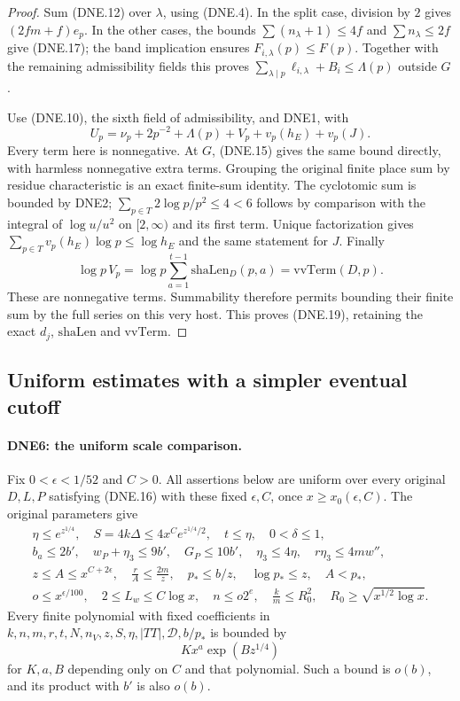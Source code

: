 \begin{proof}
Sum (DNE.12) over $\lambda$, using (DNE.4).
In the split case, division by $2$ gives $(2fm+f)e_p$.
In the other cases, the bounds $\sum(n_\lambda+1)\le4f$
and $\sum n_\lambda\le2f$ give (DNE.17); the band implication
ensures $F_{i,\lambda}(p)\le F(p)$.  Together with the remaining
admissibility fields this proves
$\sum_{\lambda\mid p}\ell_{i,\lambda}+B_i\le\Lambda(p)$
outside $G$.

Use (DNE.10), the sixth field of admissibility, and DNE1, with
\[
 U_p=\nu_p+2p^{-2}+\Lambda(p)+V_p+v_p(h_E)+v_p(J).
\]
Every term here is nonnegative.  At $G$, (DNE.15) gives the same
bound directly, with harmless nonnegative extra terms.  Grouping
the original finite place sum by residue characteristic is an exact
finite-sum identity.  The cyclotomic sum is bounded by DNE2;
$\sum_{p\in T}2\log p/p^2\le4<6$ follows by comparison with the
integral of $\log u/u^2$ on $[2,\infty)$ and its first term.
Unique factorization gives
$\sum_{p\in T}v_p(h_E)\log p\le\log h_E$ and the same statement
for $J$.  Finally
\[
 \log p\,V_p=
  \log p\sum_{a=1}^{t-1}\mathrm{shaLen}_D(p,a)
       =\mathrm{vvTerm}(D,p).
\]
These are nonnegative terms.  Summability therefore permits bounding
their finite sum by the full series on this very host.  This proves
(DNE.19), retaining the exact $d_j$, $\mathrm{shaLen}$ and $\mathrm{vvTerm}$.
\end{proof}

\subsection{Uniform estimates with a simpler eventual cutoff}

\paragraph{DNE6: the uniform scale comparison.}
\label{claim:DNE6}
Fix $0<\epsilon<1/52$ and $C>0$.  All assertions below are uniform
over every original $D,L,P$ satisfying (DNE.16) with these fixed
$\epsilon,C$, once $x\ge x_0(\epsilon,C)$.
The original parameters give
\[
\begin{gathered}
 \eta\le e^{z^{1/4}},\quad S=4k\Delta\le4x^C e^{z^{1/4}/2},
 \quad t\le\eta,\quad 0<\delta\le1,\\
 b_a\le2b',\quad w_P+\eta_3\le9b',\quad G_P\le10b',\quad
 \eta_3\le4\eta,\quad r\eta_3\le4m w'',\\
 z\le A\le x^{C+2\epsilon},\quad
 \frac rA\le\frac{2m}{z},\quad
 p_*\le b/z,\quad \log p_*\le z,\quad A<p_*,\\
 o\le x^{\epsilon/100},\quad 2\le L_w\le C\log x,
 \quad n\le o2^e,\quad \frac km\le R_0^2,
 \quad R_0\ge\sqrt{x^{1/2}\log x}.
\end{gathered}                                                    \tag{DNE.20}
\]
Every finite polynomial with fixed coefficients in
$k,n,m,r,t,N,n_V,z,S,\eta,|TT|,\mathcal D,b/p_*$ is bounded by
\[
             Kx^a\exp(Bz^{1/4})                                \tag{DNE.21}
\]
for $K,a,B$ depending only on $C$ and that polynomial.  Such a
bound is $o(b)$, and its product with $b'$ is also $o(b)$.

